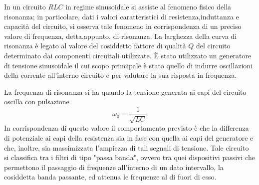 In un circuito $RLC$ in regime sinusoidale si assiste al fenomeno fisico della risonanza; in particolare, dati i valori
caratteristici di resistenza,induttanza e capacità del circuito, si osserva tale fenomeno in corrispondenza di un preciso
valore di frequenza, detta,appunto, di risonanza. La larghezza della curva di risonanza è legato al valore del cosiddetto
fattore di qualità $Q$ del circuito determinato dai componenti circuitali utilizzate.
È stato utilizzato un generatore di tensione sinusoidale il cui scopo principale è stato quello di indurre oscillazioni
della corrente all'interno circuito e per valutare la sua risposta in frequenza.

La frequenza di risonanza si ha quando la tensione generata ai capi del circuito oscilla con pulsazione
\begin{equation}
    \omega_0 = \frac{1}{\sqrt{L C}}
\end{equation}
In corrispondenza di questo valore il comportamento previsto è che la differenza di potenziale ai capi della
resistenza sia in fase con quella ai capi del generatore e che, inoltre, sia massimizzata l'ampiezza di tali segnali
di tensione.
Tale circuito si classifica tra i filtri di tipo "passa banda", ovvero tra quei dispositivi passivi che permettono il
passaggio di frequenze all'interno di un dato intervallo, la cosiddetta banda passante, ed attenua le frequenze al
di fuori di esso.
%
